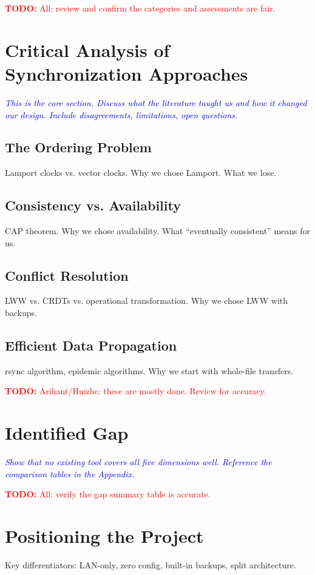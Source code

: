 \documentclass[12pt,oneside]{report}
\newcommand{\note}[1]{\textcolor{blue}{\textit{#1}}}
\newcommand{\todo}[1]{\textcolor{red}{\textbf{TODO:} #1}}
\begin{document}
\todo{All: review and confirm the categories and assessments are fair.}

\section{Critical Analysis of Synchronization Approaches}
\note{This is the core section. Discuss what the literature taught us and how it changed our design. Include disagreements, limitations, open questions.}

\subsection{The Ordering Problem}
Lamport clocks vs. vector clocks. Why we chose Lamport. What we lose.

\subsection{Consistency vs. Availability}
CAP theorem. Why we chose availability. What ``eventually consistent'' means for us.

\subsection{Conflict Resolution}
LWW vs. CRDTs vs. operational transformation. Why we chose LWW with backups.

\subsection{Efficient Data Propagation}
rsync algorithm, epidemic algorithms. Why we start with whole-file transfers.

\todo{Arihant/Huizhe: these are mostly done. Review for accuracy.}

\section{Identified Gap}
\note{Show that no existing tool covers all five dimensions well. Reference the comparison tables in the Appendix.}

\todo{All: verify the gap summary table is accurate.}

\section{Positioning the Project}
Key differentiators: LAN-only, zero config, built-in backups, split architecture.
\end{document}
